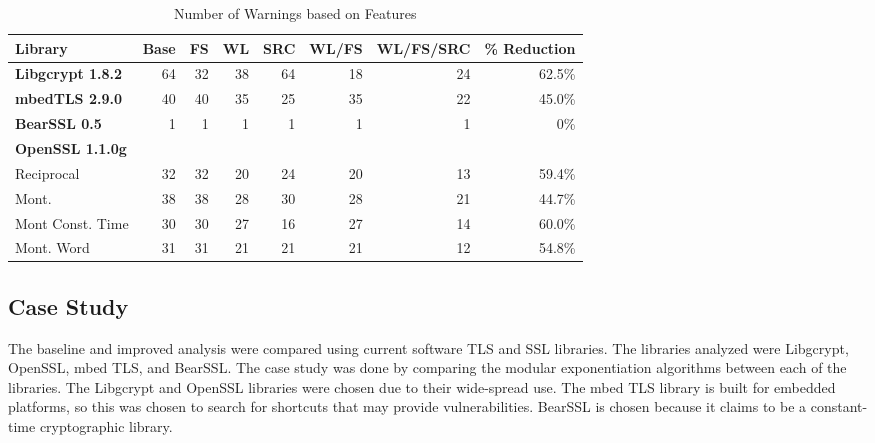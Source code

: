 \begin{table*}
  \centering
    \begin{tabular}{@{}lrrrrrrr@{}}
    \toprule
    Library & Base & FS & WL & SRC & WL/FS & WL/FS/SRC & \% Reduction\\
    \midrule
    \textbf{Libgcrypt 1.8.2} & 64 & 32 & 38 & 64 & 18 & 24 & 62.5\%\\
    \textbf{mbedTLS 2.9.0} & 40 &40 & 35 & 25 & 35 & 22 & 45.0\% \\
    \textbf{BearSSL 0.5} & 1 & 1 & 1 & 1 & 1 & 1  & 0\%\\
    \textbf{OpenSSL 1.1.0g}\\
    \hspace{0.25cm}Reciprocal             & 32 & 32  & 20    & 24   & 20 & 13  & 59.4\%\\
    \hspace{0.25cm}Mont.            & 38 & 38  & 28    & 30   & 28 & 21  & 44.7\%\\
    \hspace{0.25cm}Mont Const. Time & 30 & 30  & 27    & 16   & 27 & 14  & 60.0\% \\
    \hspace{0.25cm}Mont. Word        & 31 & 31  & 21    & 21   & 21 & 12 & 54.8\% \\
    \bottomrule
  \end{tabular}
  \caption{Number of Warnings based on Features}
  \label{tbl:overall-feature-benchmark}
\end{table*}

\subsection{Case Study}

The baseline and improved analysis were compared using current software TLS and
SSL libraries. The libraries analyzed were Libgcrypt, OpenSSL, mbed TLS, and
BearSSL. The case study was done by comparing the modular exponentiation
algorithms between each of the libraries. The Libgcrypt and OpenSSL libraries
were chosen due to their wide-spread use. The mbed TLS library is built for
embedded platforms, so this was chosen to search for shortcuts that may provide
vulnerabilities. BearSSL is chosen because it claims to be a constant-time
cryptographic library.

